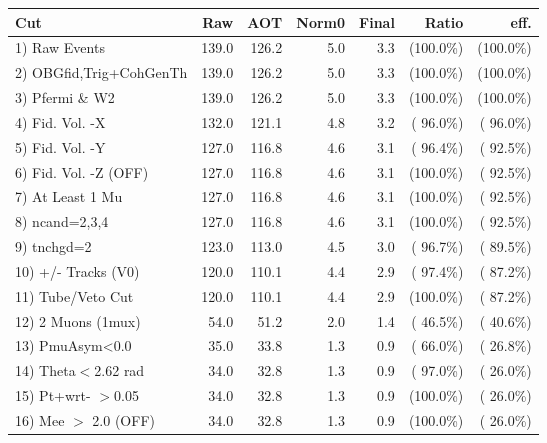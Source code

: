  \begin{table}[h!]\centering
 \begin{tabular}{||l||r|r|r|r|r|r||}
 \hline
 \hline
 Cut & Raw & AOT & Norm0 & Final & Ratio & eff.       \\
 \hline
  1) Raw Events           &        139.0 &        126.2 &          5.0 &          3.3 & (100.0\%) & (100.0\%) \\
  2) OBGfid,Trig+CohGenTh &        139.0 &        126.2 &          5.0 &          3.3 & (100.0\%) & (100.0\%) \\
  3) Pfermi \& W2         &        139.0 &        126.2 &          5.0 &          3.3 & (100.0\%) & (100.0\%) \\
  4) Fid. Vol. -X         &        132.0 &        121.1 &          4.8 &          3.2 & ( 96.0\%) & ( 96.0\%) \\
  5) Fid. Vol. -Y         &        127.0 &        116.8 &          4.6 &          3.1 & ( 96.4\%) & ( 92.5\%) \\
  6) Fid. Vol. -Z (OFF)   &        127.0 &        116.8 &          4.6 &          3.1 & (100.0\%) & ( 92.5\%) \\
  7) At Least 1 Mu        &        127.0 &        116.8 &          4.6 &          3.1 & (100.0\%) & ( 92.5\%) \\
  8) ncand=2,3,4          &        127.0 &        116.8 &          4.6 &          3.1 & (100.0\%) & ( 92.5\%) \\
  9) tnchgd=2             &        123.0 &        113.0 &          4.5 &          3.0 & ( 96.7\%) & ( 89.5\%) \\
 10) +/- Tracks (V0)      &        120.0 &        110.1 &          4.4 &          2.9 & ( 97.4\%) & ( 87.2\%) \\
 11) Tube/Veto Cut        &        120.0 &        110.1 &          4.4 &          2.9 & (100.0\%) & ( 87.2\%) \\
 12) 2 Muons (1mux)       &         54.0 &         51.2 &          2.0 &          1.4 & ( 46.5\%) & ( 40.6\%) \\
 13) PmuAsym<0.0          &         35.0 &         33.8 &          1.3 &          0.9 & ( 66.0\%) & ( 26.8\%) \\
 14) Theta$<$2.62 rad     &         34.0 &         32.8 &          1.3 &          0.9 & ( 97.0\%) & ( 26.0\%) \\
 15) Pt+wrt- $>$0.05      &         34.0 &         32.8 &          1.3 &          0.9 & (100.0\%) & ( 26.0\%) \\
 16) Mee $>$ 2.0  (OFF)   &         34.0 &         32.8 &          1.3 &          0.9 & (100.0\%) & ( 26.0\%) \\

\end{tabular}
\end{table}
